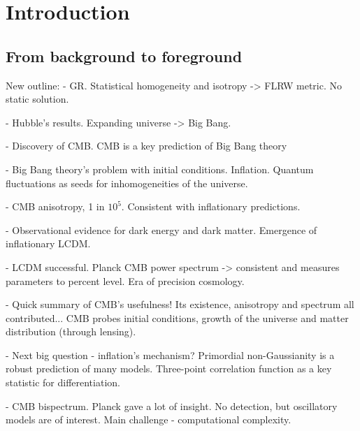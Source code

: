 
\chapter{Introduction}

\ifpdf
    \graphicspath{{Chapter1/Figs/Raster/}{Chapter1/Figs/PDF/}{Chapter1/Figs/}}
\else
    \graphicspath{{Chapter1/Figs/Vector/}{Chapter1/Figs/}}
\fi


\section{From background to foreground}

New outline:
- GR. Statistical homogeneity and isotropy -> FLRW metric. No static solution.

- Hubble's results. Expanding universe -> Big Bang.

- Discovery of CMB. CMB is a key prediction of Big Bang theory

- Big Bang theory's problem with initial conditions. Inflation. Quantum fluctuations as seeds for inhomogeneities of the universe.

- CMB anisotropy, 1 in $10^5$. Consistent with inflationary predictions.

- Observational evidence for dark energy and dark matter. Emergence of inflationary LCDM.

- LCDM successful. Planck CMB power spectrum -> consistent and measures parameters to percent level. Era of precision cosmology.

- Quick summary of CMB's usefulness! Its existence, anisotropy and spectrum all contributed...  CMB probes initial conditions, growth of the universe and matter distribution (through lensing).

- Next big question - inflation's mechanism? Primordial non-Gaussianity is a robust prediction of many models. Three-point correlation function as a key statistic for differentiation.

- CMB bispectrum. Planck gave a lot of insight. No detection, but oscillatory models are of interest. Main challenge - computational complexity.

